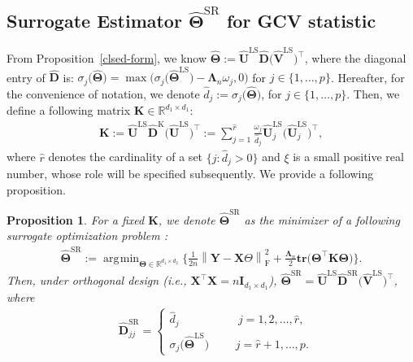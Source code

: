 \documentclass[12pt]{article}
\newtheorem{proposition}[theorem]{Proposition}
\DeclareMathOperator*{\argmin}{\arg\!\min}
\begin{document}
\subsection{Surrogate Estimator $\widehat{\boldsymbol{\Theta}}^{\text{SR}}$ for GCV statistic}
From Proposition~\ref{clsed-form}, we know $\widehat{\boldsymbol{\Theta}} := \widehat{\boldsymbol{U}}^{\text{LS}}\widehat{\boldsymbol{D}}\big(\widehat{\boldsymbol{V}}^{\text{LS}}\big)^{\top}$,
where the diagonal entry of $\widehat{\boldsymbol{D}}$ is: $\sigma_{j}\big(\widehat{\boldsymbol{\Theta}}\big) = \max \big(  \sigma_{j}\big(\widehat{\boldsymbol{\Theta}}^{\text{LS}}\big)-\boldsymbol{\Lambda}_{n} \omega_{j},0 \big)$ for $j\in\{1,\dots,p\}$.
Hereafter, for the convenience of notation, we denote $\widehat{d}_{j}:=\sigma_{j}\big(\widehat{\boldsymbol{\Theta}}\big)$, for $j\in\{1,\dots,p\}$.
Then, we define a following matrix $\boldsymbol{K}\in\mathbb{R}^{d_{1}\times d_{1}}$: 
\begin{align} \label{K}
    \boldsymbol{K}
    :=  \widehat{\boldsymbol{U}}^{\text{LS}} \widehat{\boldsymbol{D}}^{\text{K}} \big(\widehat{\boldsymbol{U}}^{\text{LS}} \big)^{\top}
    :=\sum_{j=1}^{\widehat{r}}
    \frac{\omega_{j}}{\widehat{d}_{j}}
    \widehat{\boldsymbol{U}}_{j}^{\text{LS}} \big(\widehat{\boldsymbol{U}}_{j}^{\text{LS}}\big)^{\top},
\end{align}
where $\widehat{r}$ denotes the cardinality of a set $\{j : \widehat{d}_{j}>0 \}$ and $\xi$ is a small positive real number, whose role will be specified subsequently.
We provide a following proposition.
\begin{proposition} \label{surrogate}
    For a fixed $\boldsymbol{K}$, we denote $\widehat{\boldsymbol{\Theta}}^{\text{SR}}$ as the minimizer of a following surrogate optimization problem : 
    \begin{align} \label{closed_form}
        \widehat{\boldsymbol{\Theta}}^{\text{SR}} := 
        \argmin_{\boldsymbol{\Theta}\in\mathbb{R}^{d_{1} \times d_{2}}} \Bigg\{ \frac{1}{2n} \left\| \boldsymbol{Y}-\boldsymbol{X}\Theta \right\|_{\text{F}}^{2} + \frac{\boldsymbol{\Lambda}_{n}}{2} 
        \textbf{tr}\big(\boldsymbol{\Theta}^{\top} \boldsymbol{K} \boldsymbol{\Theta} \big) \Bigg\}.
    \end{align}
    Then, under orthogonal design (i.e., $\boldsymbol{X}^{\top}\boldsymbol{X}=n\boldsymbol{I}_{d_{1} \times d_{1}}$), 
    $\widehat{\boldsymbol{\Theta}}^{\text{SR}} = \widehat{\boldsymbol{U}}^{\text{LS}}\widehat{\boldsymbol{D}}^{\text{SR}}\big(\widehat{\boldsymbol{V}}^{\text{LS}}\big)^{\top}$, where
    \begin{align*}
        &\widehat{\boldsymbol{D}}^{\text{SR}}_{jj} = 
        \begin{cases}
            \widehat{d}_{j} \qquad \qquad \quad \, j = 1,2,\dots,\widehat{r}, \\
            \sigma_{j}\big(\widehat{\boldsymbol{\Theta}}^{\text{LS}} \big)
            \quad \,\,\,\,\,\,\,\, j = \widehat{r}+1,\dots,p. 
        \end{cases}
    \end{align*}
\end{proposition}
\end{document}
